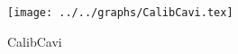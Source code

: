 \begin{figure}[h] \centering\texttt{[image: ../../graphs/CalibCavi.tex]}\caption{CalibCavi}\label{gr:CalibCavi} \end{figure}

